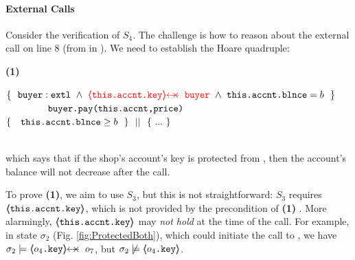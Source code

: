 {{%
 
 \label{sec:howThird}
 
\paragraph{External Calls}  Consider  the  verification of $S_4$. 
The challenge is how to reason  about the external call on line 8 (from  in ). 
We need to establish the Hoare quadruple:

 \vspace{.05cm}
  \begin{minipage}{.05\textwidth}
   \textbf{(1)}\ \ 
\end{minipage}
\hfill
\begin{minipage}{.95\textwidth}
\begin{flushleft}
$\{\  \   \external{\prg{buyer}} \ \wedge\ 
 {\color{red} {\protectedFrom {\prg{this.\myAccount.key}}  {\prg{buyer} } }}
 \ \wedge\ \prg{this.\myAccount.\balance}= b  \ \  \}$\\
$\ \ \ \ \ \ \ \ \ \ \ \ {\ \mbox{\normalfont{\texttt{buyer.pay(this.accnt,price)}}}   \ } $\\
$  \{\  \ \  {\mbox{\normalfont{\texttt{this.\mbox{\normalfont{\texttt{accnt}}}.\mbox{\normalfont{\texttt{blnce}}}}}}} \geq  b \  \  \} \ \ ||\ \  \{ \ ... \ \} $ %
\end{flushleft}
\end{minipage}
\\
\noindent
which says that  if the shop's account's key is protected from , then the account's balance will not decrease after the call.

 \vspace{.1cm}
 
To prove \textbf{(1)}, we aim to use $S_3$, but this is not straightforward: %
 $S_3$  requires 
 {\color{red} {$\langle\!\!\langle \mbox{\normalfont{\texttt{this.\mbox{\normalfont{\texttt{accnt}}}.key}}} \rangle\!\!\rangle$}}, 
 which is not provided by the precondition of \textbf{(1)} .
 More alarmingly,  
$\langle\!\!\langle \mbox{\normalfont{\texttt{this.\mbox{\normalfont{\texttt{accnt}}}.key}}} \rangle\!\!\rangle$ may \emph{not hold} at the time of the call.
%
For example, in state $\sigma_2$ (Fig. \ref{fig:ProtectedBoth}), which could initiate the call to , we have $\sigma_2 \models \protectedFrom{o_4\prg{.key}} {o_7}$, but $\sigma_2 \not\models \langle\!\!\langle o_4\mbox{\normalfont{\texttt{.key}}} \rangle\!\!\rangle$.

}}
